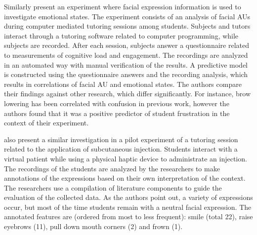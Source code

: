 Similarly \textcite{grafsgaard2013automatically} present an experiment where facial expression information is used to investigate emotional states. The experiment consists of an analysis of facial AUs during computer mediated tutoring sessions among students. Subjects and tutors interact through a tutoring software related to computer programming, while subjects are recorded. After each session, subjects answer a questionnaire related to measurements of cognitive load and engagement. The recordings are analyzed in an automated way with manual verification of the results. A predictive model is constructed using the questionnaire answers and the recording analysis, which results in correlations of facial AU and emotional states. The authors compare their findings against other research, which differ significantly. For instance, brow lowering has been correlated with confusion in previous work, however the authors found that it was a positive predictor of student frustration in the context of their experiment.

\textcite{heylen2005facial} also present a similar investigation in a pilot experiment of a tutoring session related to the application of subcutaneous injection. Students interact with a virtual patient while using a physical haptic device to administrate an injection. The recordings of the students are analyzed by the researchers to make annotations of the expressions based on their own interpretation of the context. The researchers use a compilation of literature components to guide the evaluation of the collected data. As the authors point out, a variety of expressions occur, but most of the time students remain with a neutral facial expression. The annotated features are (ordered from most to less frequent): smile (total 22), raise eyebrows (11), pull down mouth corners (2) and frown (1).


